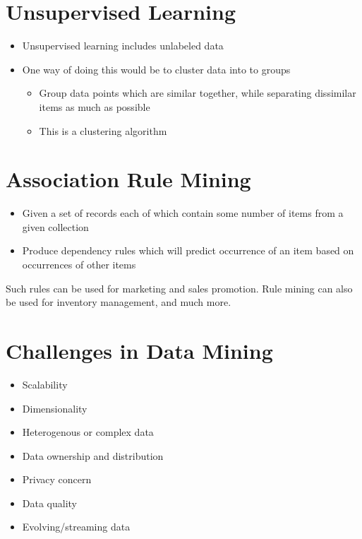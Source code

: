 \section{Unsupervised Learning}
\begin{itemize}
    \item Unsupervised learning includes unlabeled data
    \item One way of doing this would be to cluster data into to groups
    \begin{itemize}
        \item Group data points which are similar together, while separating 
        dissimilar items as much as possible
        \item This is a clustering algorithm
    \end{itemize}
\end{itemize}

\section{Association Rule Mining}
\begin{itemize}
    \item Given a set of records each of which contain some number of items from a given collection
    \item Produce dependency rules which will predict occurrence of an item based on occurrences of other items
\end{itemize}
Such rules can be used for marketing and sales promotion. Rule mining can also be used for inventory management, and much more.

\section{Challenges in Data Mining}
\begin{itemize}
    \item Scalability
    \item Dimensionality
    \item Heterogenous or complex data
    \item Data ownership and distribution
    \item Privacy concern
    \item Data quality
    \item Evolving/streaming data
\end{itemize}

